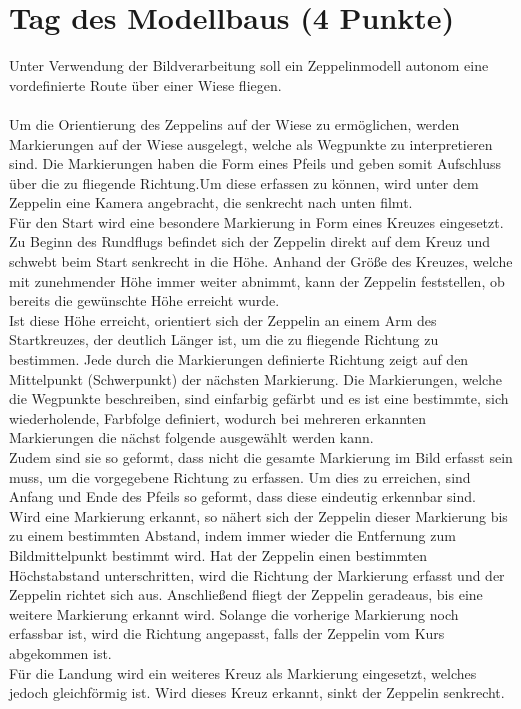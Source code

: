 \documentclass{ezb}
\begin{document}
\section{Tag des Modellbaus (4 Punkte)}
Unter Verwendung der Bildverarbeitung soll ein Zeppelinmodell autonom eine vordefinierte Route über einer Wiese fliegen.\\
\\
Um die Orientierung des Zeppelins auf der Wiese zu ermöglichen, werden Markierungen auf der Wiese ausgelegt, welche als Wegpunkte zu interpretieren sind. Die Markierungen haben die Form eines Pfeils und geben somit Aufschluss über die zu fliegende Richtung.Um diese erfassen zu können, wird unter dem Zeppelin eine Kamera angebracht, die senkrecht nach unten filmt.\\ 
\linebreak
Für den Start wird eine besondere Markierung in Form eines Kreuzes eingesetzt. Zu Beginn des Rundflugs befindet sich der Zeppelin direkt auf dem Kreuz und schwebt beim Start senkrecht in die Höhe. Anhand der Größe des Kreuzes, welche mit zunehmender Höhe immer weiter abnimmt, kann der Zeppelin feststellen, ob bereits die gewünschte Höhe erreicht wurde.\\ 
\linebreak
Ist diese Höhe erreicht, orientiert sich der Zeppelin an einem Arm des Startkreuzes, der deutlich Länger ist, um die zu fliegende Richtung zu bestimmen. Jede durch die Markierungen definierte Richtung zeigt auf den Mittelpunkt (Schwerpunkt) der nächsten Markierung. Die Markierungen, welche die Wegpunkte beschreiben, sind einfarbig gefärbt und es ist eine bestimmte, sich wiederholende, Farbfolge definiert, wodurch bei mehreren erkannten Markierungen die nächst folgende ausgewählt werden kann.\\ 
\linebreak
Zudem sind sie so geformt, dass nicht die gesamte Markierung im Bild erfasst sein muss, um die vorgegebene Richtung zu erfassen. Um dies zu erreichen, sind Anfang und Ende des Pfeils so geformt, dass diese eindeutig erkennbar sind.\\ 
\linebreak
Wird eine Markierung erkannt, so nähert sich der Zeppelin dieser Markierung bis zu einem bestimmten Abstand, indem immer wieder die Entfernung zum Bildmittelpunkt bestimmt wird. Hat der Zeppelin einen bestimmten Höchstabstand unterschritten, wird die Richtung der Markierung erfasst und der Zeppelin richtet sich aus. Anschließend fliegt der Zeppelin geradeaus, bis eine weitere Markierung erkannt wird. Solange die vorherige Markierung noch erfassbar ist, wird die Richtung angepasst, falls der Zeppelin vom Kurs abgekommen ist.\\ 
\linebreak
Für die Landung wird ein weiteres Kreuz als Markierung eingesetzt, welches jedoch gleichförmig ist. Wird dieses Kreuz erkannt, sinkt der Zeppelin senkrecht.
\end{document}
